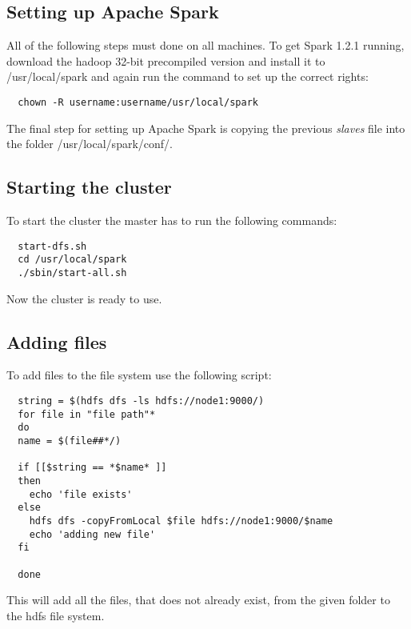 \subsection{Setting up Apache Spark}
All of the following steps must done on all machines. To get Spark 1.2.1 running, download the hadoop 32-bit precompiled version and install it to \textsf{/usr/local/spark} and again run the command to set up the correct rights:
\begin{lstlisting}
  chown -R username:username/usr/local/spark
\end{lstlisting}
The final step for setting up Apache Spark is copying the previous \emph{slaves} file into the folder \textsf{/usr/local/spark/conf/}.

\subsection{Starting the cluster}
To start the cluster the master has to run the following commands:
\begin{lstlisting}
  start-dfs.sh
  cd /usr/local/spark
  ./sbin/start-all.sh
\end{lstlisting}
Now the cluster is ready to use.

\subsection{Adding files}
To add files to the file system use the following script:
\begin{lstlisting}
  string = $(hdfs dfs -ls hdfs://node1:9000/)
  for file in "file path"*
  do
  name = $(file##*/)

  if [[$string == *$name* ]]
  then
    echo 'file exists'
  else
    hdfs dfs -copyFromLocal $file hdfs://node1:9000/$name
    echo 'adding new file'
  fi 

  done
\end{lstlisting}
This will add all the files, that does not already exist, from the given folder to the hdfs file system.


